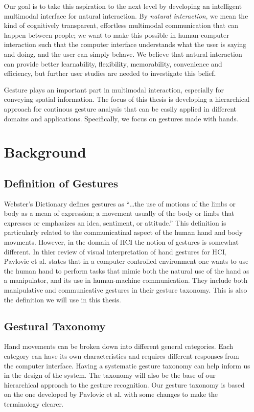 Our goal is to take this aspiration to the next level by developing an
intelligent multimodal interface for natural interaction. By \textit{natural
interaction}, we mean the kind of cognitively transparent, effortless multimodal
communication that can happen between people; we want to make this possible in
human-computer interaction such that the computer interface understands what the
user is saying and doing, and the user can simply behave. We believe that
natural interaction can provide better learnability, flexibility, memorability,
convenience and efficiency, but further user studies are needed to investigate
this belief.

Gesture plays an important part in multimodal interaction, especially for
conveying spatial information. The focus of this thesis is developing a
hierarchical approach for continous gesture analysis that can be easily
applied in different domains and applications. Specifically, we focus on
gestures made with hands.

\section{Background}

\subsection{Definition of Gestures}
Webster's Dictionary defines gestures as ``\ldots the use of motions of the
limbs or body as a mean of expression; a movement usually of the body or limbs
that expresses or emphasizes an idea, sentiment, or attitude.'' This definition
is particularly related to the communicatinal aspect of the human hand and body
movments. However, in the domain of HCI the notion of gestures is somewhat
different. In thier review of visual interpretation of hand
gestures for HCI, Pavlovic \cite{Pavlovic97} et al. states that in a computer
controlled environment one wants to use the human hand to perform tasks that
mimic both the natural use of the hand as a manipulator, and its use in
human-machine communication. They include both manipulative and communicative
gestures in their gesture taxonomy. This is also the definition we will use in
this thesis.

\subsection{Gestural Taxonomy}
Hand movements can be broken down into different general categories. Each
category can have its own characteristics and requires different responses from
the computer interface. Having a systematic gesture taxonomy can help inform
us in the design of the system. The taxonomy will also be the base of our
hierarchical approach to the gesture recognition. Our gesture taxonomy is based
on the one developed by Pavlovic et al. \cite{Pavlovic97} with some changes to
make the terminology clearer.

